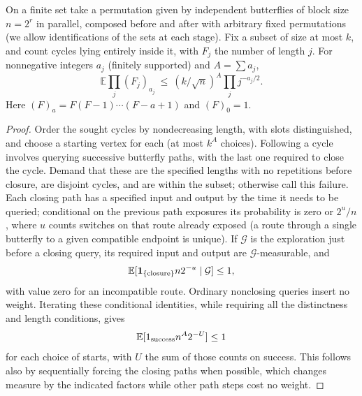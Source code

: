 \begin{lemma}\label{fac:cycle-factorial}
On a finite set take a permutation given by independent butterflies of block size $n=2^r$ in parallel, composed before and after with arbitrary fixed permutations (we allow identifications of the sets at each stage). Fix a subset of size at most $k$, and count cycles lying entirely inside it, with $F_j$ the number of length $j$. For nonnegative integers $a_j$ (finitely supported) and $A=\sum a_j$,
\begin{equation}
\mathbb E\prod_j(F_j)_{a_j}\ \le\ (k/\sqrt n)^A\prod_j j^{-a_j/2}.
\label{fac:e3}
\end{equation}
Here $(F)_a=F(F-1)\cdots(F-a+1)$ and $(F)_0=1$.
\end{lemma}
\begin{proof}
Order the sought cycles by nondecreasing length, with slots distinguished, and choose a starting vertex for each (at most $k^A$ choices). Following a cycle involves querying successive butterfly paths, with the last one required to close the cycle. Demand that these are the specified lengths with no repetitions before closure, are disjoint cycles, and are within the subset; otherwise call this failure. Each closing path has a specified input and output by the time it needs to be queried; conditional on the previous path exposures its probability is zero or $2^u/n$, where $u$ counts switches on that route already exposed (a route through a single butterfly to a given compatible endpoint is unique). If $\mathcal G$ is the exploration just before a closing query, its
required input and output are $\mathcal G$-measurable, and
\[
 \mathbb E[\mathbf1_{\{\mathrm{closure}\}}n2^{-u}\mid\mathcal G]\le1,
\]
with value zero for an incompatible route. Ordinary nonclosing queries
insert no weight. Iterating these conditional identities, while
requiring all the distinctness and length conditions, gives
\[
\mathbb E[1_{\rm success} n^A 2^{-U}]\le 1
\]
for each choice of starts, with $U$ the sum of those counts on success. This follows also by sequentially forcing the closing paths when possible, which changes measure by the indicated factors while other path steps cost no weight.


\end{proof}
